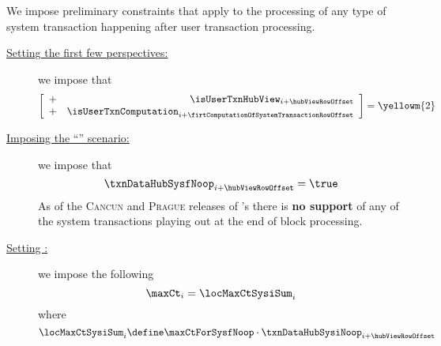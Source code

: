 \begin{center}
\end{center}
We impose preliminary constraints that apply to the processing of any type of system transaction
happening after user transaction processing.
\begin{description}
	\item[\underline{Setting the first few perspectives:}]
		we impose that
		\[
			\left[ \begin{array}{cr}
				+ & \isUserTxnHubView     _{i + \hubViewRowOffset                            } \\
				+ & \isUserTxnComputation _{i + \firtComputationOfSystemTransactionRowOffset } \\
			\end{array} \right]
			=
			\yellowm{2}
		\]
	\item[\underline{Imposing the ``'' scenario:}]
		we impose that
		\[
			\txnDataHubSysfNoop _{i + \hubViewRowOffset} = \true
		\]
		\saNote{}
		As of the \textsc{Cancun} and \textsc{Prague} releases of \linea's \zkEvm{}
		there is \textbf{no support} of any of the system transactions playing out at the end
		of block processing.
	\item[\underline{Setting \maxCt{}:}]
		we impose the following
		\[
			\maxCt _{i} = \locMaxCtSysiSum _{i}
		\]
		where
		\[
			\locMaxCtSysiSum _{i}
			\define
			\maxCtForSysfNoop \cdot \txnDataHubSysiNoop _{i + \hubViewRowOffset}
		\]
\end{description}

